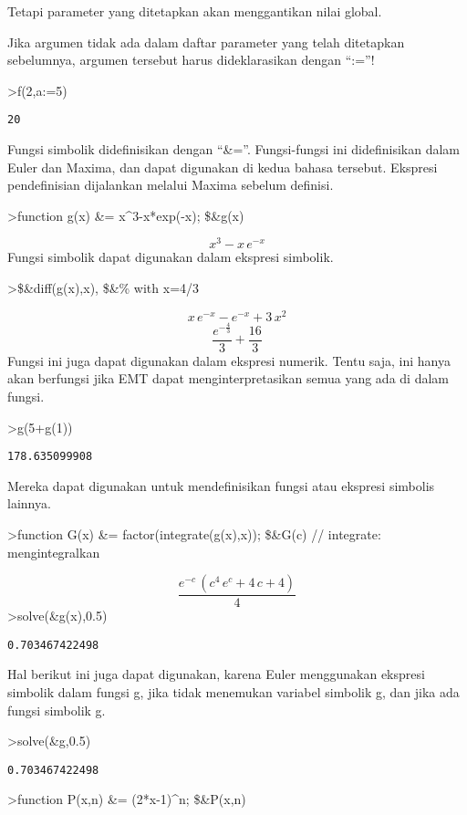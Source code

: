 \documentclass[
]{book}
\begin{document}
Tetapi parameter yang ditetapkan akan menggantikan nilai global.

Jika argumen tidak ada dalam daftar parameter yang telah ditetapkan sebelumnya, argumen tersebut harus dideklarasikan dengan ``:=''!

\textgreater f(2,a:=5)

\begin{verbatim}
20
\end{verbatim}

Fungsi simbolik didefinisikan dengan ``\&=''. Fungsi-fungsi ini didefinisikan dalam Euler dan Maxima, dan dapat digunakan di kedua bahasa tersebut. Ekspresi pendefinisian dijalankan melalui Maxima sebelum definisi.

\textgreater function g(x) \&= x\^{}3-x*exp(-x); \$\&g(x)

\[x^3-x\,e^ {- x }\]Fungsi simbolik dapat digunakan dalam ekspresi simbolik.

\textgreater\$\&diff(g(x),x), \$\&\% with x=4/3

\[x\,e^ {- x }-e^ {- x }+3\,x^2\]\[\frac{e^ {- \frac{4}{3} }}{3}+\frac{16}{3}\]Fungsi ini juga dapat digunakan dalam ekspresi numerik. Tentu saja, ini hanya akan berfungsi jika EMT dapat menginterpretasikan semua yang ada di dalam fungsi.

\textgreater g(5+g(1))

\begin{verbatim}
178.635099908
\end{verbatim}

Mereka dapat digunakan untuk mendefinisikan fungsi atau ekspresi simbolis lainnya.

\textgreater function G(x) \&= factor(integrate(g(x),x)); \$\&G(c) // integrate: mengintegralkan

\[\frac{e^ {- c }\,\left(c^4\,e^{c}+4\,c+4\right)}{4}\]\textgreater solve(\&g(x),0.5)

\begin{verbatim}
0.703467422498
\end{verbatim}

Hal berikut ini juga dapat digunakan, karena Euler menggunakan ekspresi simbolik dalam fungsi g, jika tidak menemukan variabel simbolik g, dan jika ada fungsi simbolik g.

\textgreater solve(\&g,0.5)

\begin{verbatim}
0.703467422498
\end{verbatim}

\textgreater function P(x,n) \&= (2*x-1)\^{}n; \$\&P(x,n)
\end{document}
